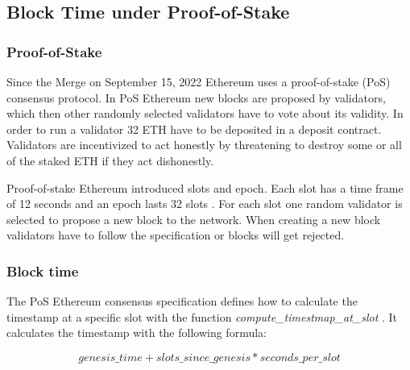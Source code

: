 %

\subsection{Block Time under Proof-of-Stake}

\subsubsection{Proof-of-Stake}

Since the Merge on September 15, 2022 Ethereum uses a proof-of-stake (PoS)
consensus protocol. In PoS Ethereum new blocks are proposed by validators,
which then other randomly selected validators have to vote about its validity. 
In order to run a validator 32 ETH have to be deposited in a deposit
contract. Validators are incentivized to act honestly by threatening to destroy
some or all of the staked ETH if they act dishonestly.

Proof-of-stake Ethereum introduced slots and epoch. Each slot has a time frame
of 12 seconds and an epoch lasts 32 slots
\cite{seconds-per-slot-mainnet}\cite{seconds-per-slot-mainnet-doc}. For each
slot one random validator is selected to propose a new block to the network.
When creating a new block validators have to follow the specification or blocks
will get rejected.


\subsubsection{Block time}

The PoS Ethereum consensus specification defines how to calculate the timestamp
at a specific slot with the function \textit{compute\_timestmap\_at\_slot}
\cite{compute-timestamp-at-slot}. It calculates the timestamp with the
following formula:

\begin{equation}
genesis\_time + slots\_since\_genesis *
seconds\_per\_slot
\end{equation}

